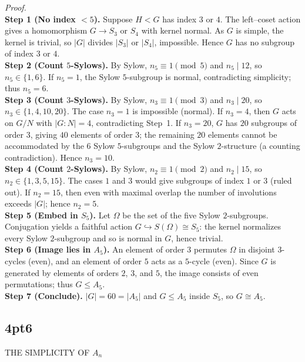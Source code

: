 \documentclass[12pt]{article}
\theoremstyle{definition}
\begin{document}
\emph{Proof.}\\
\textbf{Step 1 (No index $<5$).} Suppose $H<G$ has index $3$ or $4$. The left–coset action gives a homomorphism $G\to S_3$ or $S_4$ with kernel normal. As $G$ is simple, the kernel is trivial, so $|G|$ divides $|S_3|$ or $|S_4|$, impossible. Hence $G$ has no subgroup of index $3$ or $4$.\\
\textbf{Step 2 (Count $5$-Sylows).} By Sylow, $n_5\equiv1\pmod5$ and $n_5\mid 12$, so $n_5\in\{1,6\}$. If $n_5=1$, the Sylow $5$-subgroup is normal, contradicting simplicity; thus $n_5=6$.\\
\textbf{Step 3 (Count $3$-Sylows).} By Sylow, $n_3\equiv1\pmod3$ and $n_3\mid 20$, so $n_3\in\{1,4,10,20\}$. The case $n_3=1$ is impossible (normal). If $n_3=4$, then $G$ acts on $G/N$ with $|G:N|=4$, contradicting Step~1. If $n_3=20$, $G$ has $20$ subgroups of order $3$, giving $40$ elements of order $3$; the remaining $20$ elements cannot be accommodated by the $6$ Sylow $5$-subgroups and the Sylow $2$-structure (a counting contradiction). Hence $n_3=10$.\\
\textbf{Step 4 (Count $2$-Sylows).} By Sylow, $n_2\equiv1\pmod2$ and $n_2\mid 15$, so $n_2\in\{1,3,5,15\}$. The cases $1$ and $3$ would give subgroups of index $1$ or $3$ (ruled out). If $n_2=15$, then even with maximal overlap the number of involutions exceeds $|G|$; hence $n_2=5$.\\
\textbf{Step 5 (Embed in $S_5$).} Let $\Omega$ be the set of the five Sylow $2$-subgroups. Conjugation yields a faithful action $G\hookrightarrow S(\Omega)\cong S_5$: the kernel normalizes every Sylow $2$-subgroup and so is normal in $G$, hence trivial.\\
\textbf{Step 6 (Image lies in $A_5$).} An element of order $3$ permutes $\Omega$ in disjoint $3$-cycles (even), and an element of order $5$ acts as a $5$-cycle (even). Since $G$ is generated by elements of orders $2$, $3$, and $5$, the image consists of even permutations; thus $G\le A_5$.\\
\textbf{Step 7 (Conclude).} $|G|=60=|A_5|$ and $G\le A_5$ inside $S_5$, so $G\cong A_5$.\\

\newpage

\subsection*{4pt6}

\newpage

THE SIMPLICITY OF $A_n$
\end{document}
